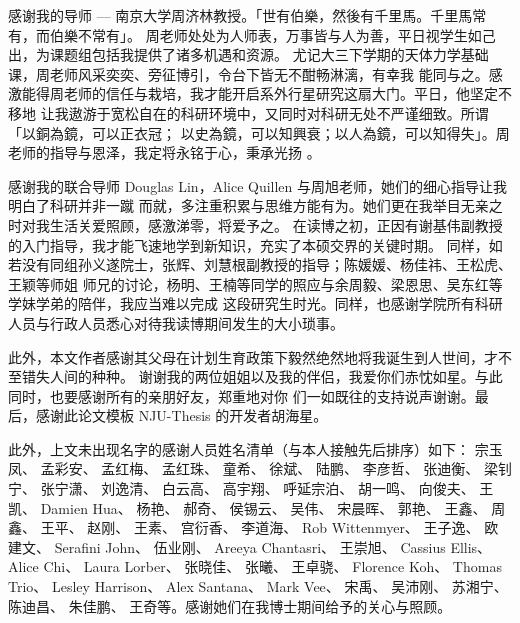 \begin{acknowledgement}

感谢我的导师 --- 南京大学周济林教授。「世有伯樂，然後有千里馬。千里馬常有，而伯樂不常有」。
周老师处处为人师表，万事皆与人为善，平日视学生如己出，为课题组包括我提供了诸多机遇和资源。
尤记大三下学期的天体力学基础课，周老师风采奕奕、旁征博引，令台下皆无不酣畅淋漓，有幸我
能同与之。感激能得周老师的信任与栽培，我才能开启系外行星研究这扇大门。平日，他坚定不移地
让我遨游于宽松自在的科研环境中，又同时对科研无处不严谨细致。所谓「以銅為鏡，可以正衣冠；
以史為鏡，可以知興衰；以人為鏡，可以知得失」。周老师的指导与恩泽，我定将永铭于心，秉承光扬 。

\vspace{1em}

感谢我的联合导师 Douglas Lin，Alice Quillen 与周旭老师，她们的细心指导让我明白了科研并非一蹴
而就，多注重积累与思维方能有为。她们更在我举目无亲之时对我生活关爱照顾，感激涕零，将爱予之。
在读博之初，正因有谢基伟副教授的入门指导，我才能飞速地学到新知识，充实了本硕交界的关键时期。
同样，如若没有同组孙义遂院士，张辉、刘慧根副教授的指导；陈媛媛、杨佳祎、王松虎、王颖等师姐
师兄的讨论，杨明、王楠等同学的照应与余周毅、梁恩思、吴东红等学妹学弟的陪伴，我应当难以完成
这段研究生时光。同样，也感谢学院所有科研人员与行政人员悉心对待我读博期间发生的大小琐事。

\vspace{1em}

此外，本文作者感谢其父母在计划生育政策下毅然绝然地将我诞生到人世间，才不至错失人间的种种。
谢谢我的两位姐姐以及我的伴侣，我爱你们赤忱如星。与此同时，也要感谢所有的亲朋好友，郑重地对你
们一如既往的支持说声谢谢。最后，感谢此论文模板 NJU-Thesis 的开发者胡海星。

\pagebreak

此外，上文未出现名字的感谢人员姓名清单（与本人接触先后排序）如下：
宗玉凤、
孟彩安、
孟红梅、
孟红珠、
童希、
徐斌、
陆鹏、
李彦哲、
张迪衡、
梁钊宁、
张宁潇、
刘逸清、
白云高、
高宇翔、
呼延宗泊、
胡一鸣、
向俊夫、
王凯、
Damien Hua、
杨艳、
郝奇、
侯锡云、
吴伟、
宋晨晖、
郭艳、
王鑫、
周鑫、
王平、
赵刚、
王素、
宫衍香、
李道海、
Rob Wittenmyer、
王子逸、
欧建文、
Serafini John、
伍业刚、
Areeya Chantasri、
王崇旭、
Cassius Ellis、
Alice Chi、
Laura Lorber、
张晓佳、
张曦、
王卓骁、
Florence Koh、
Thomas Trio、
Lesley Harrison、
Alex Santana、
Mark Vee、
宋禹、
吴沛刚、
苏湘宁、
陈迪昌、
朱佳鹏、
王奇等。感谢她们在我博士期间给予的关心与照顾。

\end{acknowledgement}
